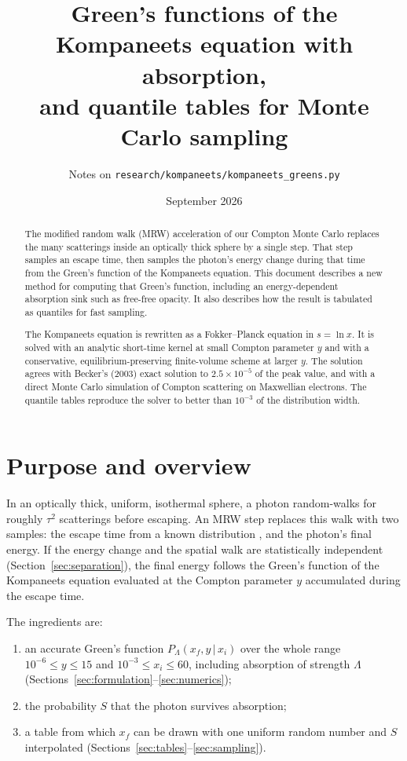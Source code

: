 \documentclass[11pt]{article}
\title{Green's functions of the Kompaneets equation with absorption,\\
and quantile tables for Monte Carlo sampling}
\author{Notes on \texttt{research/kompaneets/kompaneets\_greens.py}}
\date{September 2026}
\begin{document}
\maketitle

\begin{abstract}
The modified random walk (MRW) acceleration of our Compton Monte Carlo replaces
the many scatterings inside an optically thick sphere by a single step. That
step samples an escape time, then samples the photon's energy change during
that time from the Green's function of the Kompaneets equation. This document
describes a new method for computing that Green's function, including an
energy-dependent absorption sink such as free-free opacity. It also describes
how the result is tabulated as quantiles for fast sampling.

The Kompaneets equation is rewritten as a Fokker--Planck equation in
$s=\ln x$. It is solved with an analytic short-time kernel at small Compton
parameter $y$ and with a conservative, equilibrium-preserving finite-volume
scheme at larger $y$. The solution agrees with Becker's (2003) exact solution
to $2.5\times10^{-5}$ of the peak value, and with a direct Monte Carlo
simulation of Compton scattering on Maxwellian electrons. The quantile tables
reproduce the solver to better than $10^{-3}$ of the distribution width.
\end{abstract}

\tableofcontents

\section{Purpose and overview}

In an optically thick, uniform, isothermal sphere, a photon random-walks for
roughly $\tau^2$ scatterings before escaping. An MRW step replaces this walk
with two samples: the escape time from a known distribution
\citep{fleck1984,min2009,robitaille2010}, and the photon's final energy.
If the energy change and the spatial walk are statistically independent
(Section~\ref{sec:separation}), the final energy follows the Green's function
of the Kompaneets equation evaluated at the Compton parameter $y$
accumulated during the escape time.

The ingredients are:
\begin{enumerate}
\item an accurate Green's function $P_\Lambda(x_f,y\,|\,x_i)$ over the whole
  range $10^{-6}\le y\le 15$ and $10^{-3}\le x_i\le 60$, including absorption
  of strength $\Lambda$ (Sections~\ref{sec:formulation}--\ref{sec:numerics});
\item the probability $S$ that the photon survives absorption;
\item a table from which $x_f$ can be drawn with one uniform random number
  and $S$ interpolated (Sections~\ref{sec:tables}--\ref{sec:sampling}).
\end{enumerate}
\end{document}
